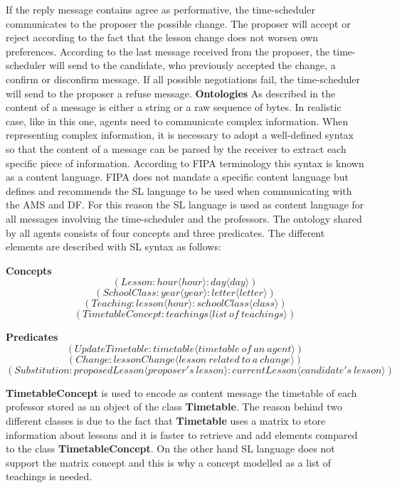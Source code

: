 If the reply message contains agree as performative, the time-scheduler communicates to the proposer the possible change. The proposer will accept or reject according to the fact that the lesson change does not worsen own preferences.
According to the last message received from the proposer, the time-scheduler will send to the candidate, who previously accepted the change, a confirm or disconfirm message.
If all possible negotiations fail, the time-scheduler will send to the proposer a refuse message.\newline\newline
\textbf{Ontologies}\newline\newline
As described in \cite{10.1007/3-540-44631-1_7} the content of a message is either a string or a raw sequence of bytes. In realistic case, like in this one, agents need to communicate complex information. When representing complex information, it is necessary to adopt a well-defined syntax so that the content of a message can be parsed by the receiver to extract each specific piece of information. According to FIPA terminology this syntax is known as a content language. FIPA does not mandate a specific content language but defines and recommends the SL language to be used when communicating with the AMS and DF.\newline
For this reason the SL language is used as content language for all messages involving the time-scheduler and the professors. The ontology shared by all agents consists of four concepts and three predicates. The different elements are described with SL syntax as follows:\newline

\textbf{Concepts}
\[(Lesson :hour \langle hour\rangle :day \langle day \rangle)\]
\[(SchoolClass :year \langle year\rangle :letter \langle letter \rangle)\]
\[(Teaching :lesson \langle hour\rangle :schoolClass \langle class \rangle)\]
\[(TimetableConcept :teachings \langle list \: of \: teachings\rangle)\]

\textbf{Predicates}
\[(UpdateTimetable :timetable \langle timetable\:of\:an\:agent \rangle )\]
\[(Change :lessonChange \langle lesson\:related\:to\:a\:change \rangle )\]
\[(Substitution :proposedLesson \langle proposer's \: lesson \rangle :currentLesson \langle candidate's \: lesson \rangle)\]


\textbf{TimetableConcept} is used to encode as content message the timetable of each professor stored as an object of the class \textbf{Timetable}. The reason behind two different classes is due to the fact that \textbf{Timetable} uses a matrix to store information about lessons and it is faster to retrieve and add elements compared to the class \textbf{TimetableConcept}. On the other hand SL language does not support the matrix concept and this is why a concept modelled as a list of teachings is needed.

